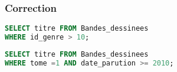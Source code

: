 \documentclass[svgnames,11pt]{beamer}
\begin{document}
\begin{frame}[fragile]
    \frametitle{Correction}

    \begin{center}
        \begin{lstlisting}[language=SQL , basicstyle=\ttfamily\small, xleftmargin=1em, xrightmargin=-1em]
SELECT titre FROM Bandes_dessinees 
WHERE id_genre > 10;
\end{lstlisting}
    \end{center}

    \begin{center}
        \begin{lstlisting}[language=SQL , basicstyle=\ttfamily\small, xleftmargin=1em, xrightmargin=-1em]
SELECT titre FROM Bandes_dessinees 
WHERE tome =1 AND date_parution >= 2010;
\end{lstlisting}
    \end{center}
\end{frame}
\end{document}
